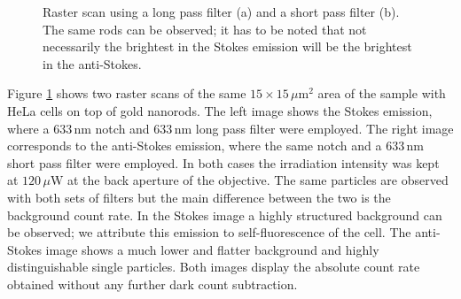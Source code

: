 \documentclass[journal=nalefd,manuscript=letter]{achemso}
\newcommand{\nm}{\ensuremath{\,\textrm{nm}}}
\newcommand{\um}{\ensuremath{\,\mu\textrm{m}}}
\newcommand{\uW}{\ensuremath{\,\mu\textrm{W}}}
\begin{document}
\begin{figure}[htp]
\centering
	\caption{Raster scan using a long pass filter (a) and a short pass filter (b).
	The same rods can be observed; it has to be noted that not necessarily the
	brightest in the Stokes emission will be the brightest in the anti-Stokes.}
	\label{fig:shortpass_longpass}
\end{figure}

Figure \ref{fig:shortpass_longpass} shows two raster scans of the same
$15\times15\um^2$ area of the sample with HeLa cells on top of gold
nanorods. The left image shows the Stokes emission, where a $633\nm$ notch and
$633\nm$ long pass filter were employed. The right image corresponds to the
anti-Stokes emission, where the same notch and a $633\nm$ short pass filter were
employed. In both cases the irradiation intensity was kept at $120\uW$ at
the back aperture of the objective. The same particles are observed with both sets
of filters but the main difference between the two is the background count rate.
In the Stokes image a highly structured background can be observed; we
attribute this emission to self-fluorescence of the cell. The anti-Stokes
image shows a much lower and flatter background and highly distinguishable
single particles. Both images display the absolute count rate obtained without any
further dark count subtraction. 
\end{document}
